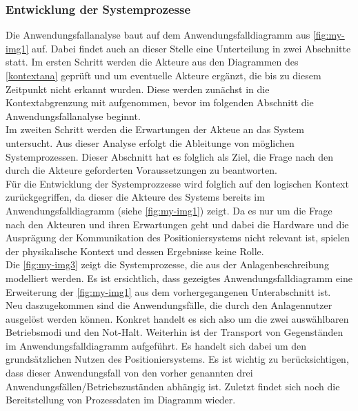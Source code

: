 \documentclass[../Bachelorarbeit.tex]{subfiles}
\begin{document}
\subsubsection{Entwicklung der Systemprozesse}
Die Anwendungsfallanalyse baut auf dem Anwendungsfalldiagramm aus \autoref{fig:my-img1} auf. Dabei findet auch an dieser Stelle eine Unterteilung in zwei Abschnitte statt. Im ersten Schritt werden die Akteure aus den Diagrammen des \autoref{kontextana} geprüft und um eventuelle Akteure ergänzt, die bis zu diesem Zeitpunkt nicht erkannt wurden. Diese werden zunächst in die Kontextabgrenzung mit aufgenommen, bevor im folgenden Abschnitt die Anwendungsfallanalyse beginnt.\\
Im zweiten Schritt werden die Erwartungen der Akteue an das System untersucht. Aus dieser Analyse erfolgt die Ableitunge von möglichen Systemprozessen. Dieser Abschnitt hat es folglich als Ziel, die Frage nach den durch die Akteure geforderten Voraussetzungen zu beantworten.\\
Für die Entwicklung der Systemprozzesse wird folglich auf den logischen Kontext zurückgegriffen, da dieser die Akteure des Systems bereits im Anwendungsfalldiagramm (siehe \autoref{fig:my-img1}) zeigt. Da es nur um die Frage nach den Akteuren und ihren Erwartungen geht und dabei die Hardware und die Ausprägung der Kommunikation des Positioniersystems nicht relevant ist, spielen der physikalische Kontext und dessen Ergebnisse keine Rolle.\\
Die \autoref{fig:my-img3} zeigt die Systemprozesse, die aus der Anlagenbeschreibung modelliert werden. Es ist ersichtlich, dass gezeigtes Anwendungsfalldiagramm eine Erweiterung der \autoref{fig:my-img1} aus dem vorhergegangenen Unterabschnitt ist.\\
Neu daszugekommen sind die Anwendungsfälle, die durch den Anlagennutzer ausgelöst werden können. Konkret handelt es sich also um die zwei auswählbaren Betriebsmodi und den Not-Halt. Weiterhin ist der Transport von Gegenständen im Anwendungsfalldiagramm aufgeführt. Es handelt sich dabei um den grundsätzlichen Nutzen des Positioniersystems. Es ist wichtig zu berücksichtigen, dass dieser Anwendungsfall von den vorher genannten drei Anwendungsfällen/Betriebszuständen abhängig ist. Zuletzt findet sich noch die Bereitstellung von Prozessdaten im Diagramm wieder.
\end{document}
